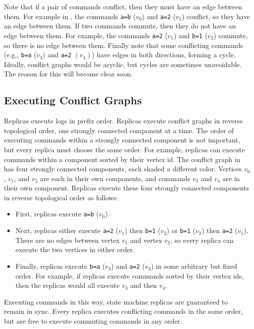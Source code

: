 {}

Note that if a pair of commands conflict, then they must have an edge between
them. For example in , the commands \texttt{a=b} ($v_0$)
and \texttt{a=2} ($v_1$) conflict, so they have an edge between them. If two
commands commute, then they do not have an edge between them. For
example, the commands \texttt{a=2} ($v_1$) and \texttt{b=1} ($v_2$) commute, so
there is no edge between them. Finally note that some conflicting commands
(e.g., \texttt{b=a} ($v_3)$ and \texttt{a=2} $(v_4)$) have edges in both
directions, forming a cycle. Ideally, conflict graphs would be acyclic, but
cycles are sometimes unavoidable. The reason for this will become clear soon.

\subsection{Executing Conflict Graphs}
Replicas execute logs in prefix order. Replicas execute conflict graphs in
reverse topological order, one strongly connected component at a time.  The
order of executing commands within a strongly connected component is not
important, but every replica must choose the same order. For example, replicas
can execute commands within a component sorted by their vertex id.
%
The conflict graph in  has four strongly connected
components, each shaded a different color. Vertices $v_0$, $v_1$, and $v_2$ are
each in their own components, and commands $v_3$ and $v_4$ are in their own
component. Replicas execute these four strongly connected components in reverse
topological order as follows:
\begin{itemize}
  \item
    First, replicas execute \texttt{a=b} ($v_0$).

  \item
    Next, replicas either execute \texttt{a=2} ($v_1$) then \texttt{b=1}
    ($v_2$) or \texttt{b=1} ($v_2$) then \texttt{a=2} ($v_1$). There are no
    edges between vertex $v_1$ and vertex $v_2$, so every replica can execute
    the two vertices in either order.

  \item
    Finally, replicas execute \texttt{b=a} ($v_3$) and \texttt{a=2} ($v_4$) in
    some arbitrary but fixed order. For example, if replicas execute commands
    sorted by their vertex ids, then the replicas would all execute $v_3$ and
    then $v_4$.
\end{itemize}
Executing commands in this way, state machine replicas are guaranteed to remain
in sync. Every replica executes conflicting commands in the same order, but are
free to execute commuting commands in any order.

